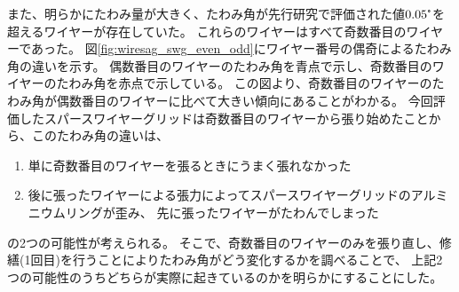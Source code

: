 \documentclass[../../main.tex]{subfiles}
\begin{document}
また、明らかにたわみ量が大きく、たわみ角が先行研究で評価された値$0.05\tcdegree$を超えるワイヤーが存在していた。
これらのワイヤーはすべて奇数番目のワイヤーであった。
図\ref{fig:wiresag_swg_even_odd}にワイヤー番号の偶奇によるたわみ角の違いを示す。
偶数番目のワイヤーのたわみ角を青点で示し、奇数番目のワイヤーのたわみ角を赤点で示している。
この図より、奇数番目のワイヤーのたわみ角が偶数番目のワイヤーに比べて大きい傾向にあることがわかる。
今回評価したスパースワイヤーグリッドは奇数番目のワイヤーから張り始めたことから、このたわみ角の違いは、
\begin{enumerate}
    \item 単に奇数番目のワイヤーを張るときにうまく張れなかった
    \item 後に張ったワイヤーによる張力によってスパースワイヤーグリッドのアルミニウムリングが歪み、
          先に張ったワイヤーがたわんでしまった
\end{enumerate}
の2つの可能性が考えられる。
そこで、奇数番目のワイヤーのみを張り直し、修繕(1回目)を行うことによりたわみ角がどう変化するかを調べることで、
上記2つの可能性のうちどちらが実際に起きているのかを明らかにすることにした。
\end{document}
